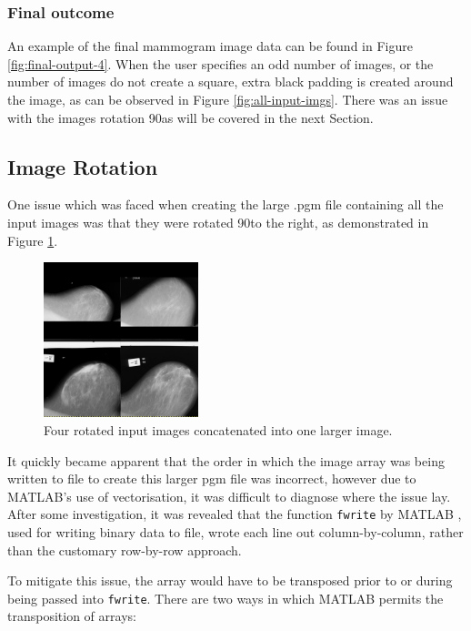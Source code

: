 \subsubsection{Final outcome}

An example of the final mammogram image data can be found in Figure \ref{fig:final-output-4}. When the user specifies an odd number of images, or the number of images do not create a square, extra black padding is created around the image, as can be observed in Figure \ref{fig:all-input-imgs}. There was an issue with the images rotation 90\degree as will be covered in the next Section.


\subsection{Image Rotation}
\label{ssec:trans}

One issue which was faced when creating the large .pgm file containing all the input images was that they were rotated 90\degree to the right, as demonstrated in Figure \ref{fig:rotated-input}.

\begin{figure}[H]
  \centering
  \includegraphics[width=0.4\textwidth]{Chapter2/technical-img/rotation.png}
  \caption{Four rotated input images concatenated into one larger image.}
  \label{fig:rotated-input}
\end{figure}

It quickly became apparent that the order in which the image array was being written to file to create this larger pgm file was incorrect, however due to MATLAB's use of vectorisation, it was difficult to diagnose where the issue lay. After some investigation, it was revealed that the function \texttt{fwrite} by MATLAB \cite{fwrite}, used for writing binary data to file, wrote each line out column-by-column, rather than the customary row-by-row approach.

To mitigate this issue, the array would have to be transposed prior to or during being passed into \texttt{fwrite}. There are two ways in which MATLAB permits the \gls{transposition} of arrays:

